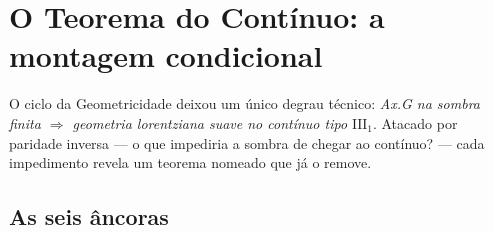 \documentclass[11pt,a4paper]{article}
\begin{document}
\section{O Teorema do Contínuo: a montagem condicional}\label{sec:continuo}
O ciclo da Geometricidade deixou um único degrau técnico:
\emph{Ax.G na sombra finita $\Rightarrow$ geometria lorentziana suave no
contínuo tipo $\mathrm{III}_1$}. Atacado por paridade inversa --- o que
impediria a sombra de chegar ao contínuo? --- cada impedimento revela um
teorema nomeado que já o remove.

\subsection{As seis âncoras}
\end{document}
